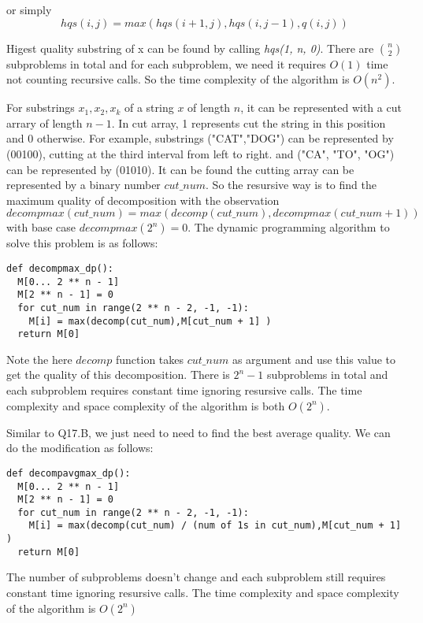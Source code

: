 \documentclass[12pt,a4paper]{article}
\newcommand{\question}[1]{\bigskip\noindent{\textbf{Q{#1} solution}}}
\begin{document}
or simply
\begin{equation*}
hqs(i,j) = max(hqs(i + 1, j), hqs(i, j - 1), q(i,j))
\end{equation*}

Higest quality substring of x can be found by calling {\em hqs(1, n, 0)}. There are $n \choose 2$ subproblems in total and for each subproblem, we need it requires $O(1)$ time not counting recursive calls. So the time complexity of the algorithm is $O(n^2)$.

\question{17.B}

For substrings $x_1, x_2, x_k$ of a string $x$ of length $n$, it can be represented with a cut arrary of length $n - 1$. In cut array, 1 represents cut the string in this position and 0 otherwise. For example, substrings ("CAT","DOG") can be represented by (00100), cutting at the third interval from left to right. and ("CA", "TO", "OG") can be represented by (01010). It can be found the cutting array can be represented by a binary number $cut\_num$. So the resursive way is to find the maximum quality of decomposition with the observation
$$
decompmax(cut\_num) = max(decomp(cut\_num), decompmax(cut\_num + 1))
$$
with base case $decompmax(2 ^ n) = 0$. The dynamic programming algorithm to solve this problem is as follows:
\begin{lstlisting}
def decompmax_dp():
  M[0... 2 ** n - 1]
  M[2 ** n - 1] = 0
  for cut_num in range(2 ** n - 2, -1, -1):
    M[i] = max(decomp(cut_num),M[cut_num + 1] )
  return M[0]
\end{lstlisting}
Note the here $decomp$ function takes $cut\_num$ as argument and use this value to get the quality of this decomposition. There is $2 ^ n - 1$ subproblems in total and each subproblem requires constant time ignoring resursive calls. The time complexity and space complexity of the algorithm is both $O(2^n)$.

\question{17.C}

Similar to Q17.B, we just need to need to find the best average quality. We can do the modification as follows:
\begin{lstlisting}
def decompavgmax_dp():
  M[0... 2 ** n - 1]
  M[2 ** n - 1] = 0
  for cut_num in range(2 ** n - 2, -1, -1):
    M[i] = max(decomp(cut_num) / (num of 1s in cut_num),M[cut_num + 1] )
  return M[0]
\end{lstlisting}

The number of subproblems doesn't change and each subproblem still requires constant time ignoring resursive calls. The time complexity and space complexity of the algorithm is $O(2^n)$
\end{document}

